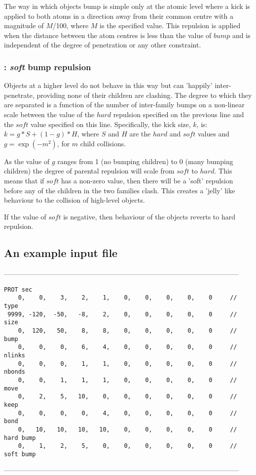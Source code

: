 The way in which objects bump is simple only at the atomic level where a kick is applied
to both atoms in a direction away from their common centre with a magnitude of $M$/100,
where $M$ is the specified value.  This repulsion is applied when the distance between
the atom centres is less than the value of $bump$ and is independent of the degree of
penetration or any other constraint.

\subsubsection{: {\em soft} bump repulsion}

Objects at a higher level do not behave in this way but can 'happily' inter-penetrate,
providing none of their children are clashing.   The degree to which they are separated
is a function of the number of inter-family bumps on a non-linear scale between the value
of the $hard$ repulsion specified on the previous line and the $soft$ value specified
on this line.  Specifically, the kick size, $k$, is: $k = g*S + (1-g)*H$, where $S$ 
and $H$ are the $hard$ and $soft$ values and $g = \exp (-m^2)$, for $m$ child collisions.

As the value of $g$ ranges from 1 (no bumping children) to 0 (many bumping children) the
degree of parental repulsion will scale from $soft$ to $hard$.   This means that if $soft$
has a non-zero value, then there will be a 'soft' repulsion before any of the children in the
two families clash.  This creates a 'jelly' like behaviour to the collision of high-level
objects.

If the value of $soft$ is negative, then behaviour of the objects reverts to hard repulsion.

\subsection{An example input file}

\begin{singlespace}
------------------------------------------------------------------------------------------------------
\begin{footnotesize}
\begin{verbatim}
PROT sec
    0,    0,    3,    2,    1,    0,    0,    0,    0,    0    	// type
 9999, -120,  -50,   -8,    2,    0,    0,    0,    0,    0    	// size
    0,  120,   50,    8,    8,    0,    0,    0,    0,    0    	// bump
    0,    0,    0,    6,    4,    0,    0,    0,    0,    0    	// nlinks
    0,    0,    0,    1,    1,    0,    0,    0,    0,    0    	// nbonds
    0,    0,    1,    1,    1,    0,    0,    0,    0,    0    	// move
    0,    2,    5,   10,    0,    0,    0,    0,    0,    0    	// keep
    0,    0,    0,    0,    4,    0,    0,    0,    0,    0    	// bond
    0,   10,   10,   10,   10,    0,    0,    0,    0,    0    	// hard bump
    0,    1,    2,    5,    0,    0,    0,    0,    0,    0    	// soft bump
\end{verbatim}
\end{footnotesize}
------------------------------------------------------------------------------------------------------
\end{singlespace}

